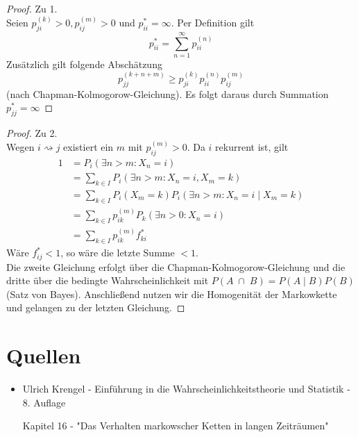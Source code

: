 \documentclass[a4paper]{article}
\begin{document}
\begin{proof}
	Zu 1.
	\\

	Seien $p_{ji} ^{(k)} > 0, p_{ij} ^{(m)} > 0$ und 
	$p_{ii} ^{*} = \infty$. Per Definition gilt
	\[
	p_{ii} ^{*} = \sum_{n=1}^{\infty} p_{ii} ^{(n)}
	\] 
	Zusätzlich gilt folgende Abschätzung 
	\[
	p_{jj} ^{(k+n+m)} \geq p_{ji} ^{(k)}
	p_{ii} ^{(n)} p_{ij} ^{(m)}
	\] 
	(nach Chapman-Kolmogorow-Gleichung).
	Es folgt daraus durch Summation $p_{jj} ^{*} = \infty$
\end{proof}

\begin{proof}
	Zu 2.
	\\
	
	Wegen $i \rightsquigarrow j$ existiert ein $m$ mit $p_{ij} ^{(m)} > 0$.
	Da $i$ rekurrent ist, gilt
	\begin{align*}
		1 &= P_i \left(
			\exists n > m : X_n = i
		\right) \\
		  &= \sum_{k \in I} P_i \left(
		  	\exists n > m: X_n = i, X_m = k
		  \right) \\
		  &= \sum_{k \in I}
		  P_i (X_m = k)
		  P_i \left(
		  	\exists n > m: X_n = i \; \vert \; X_m = k
		  \right) \\
		  &= \sum_{k \in I}
		  p_{ik} ^{(m)}
		  P_k \left(
		  	\exists n > 0: X_n = i
		  \right) \\
		  &= \sum_{k \in I}
		  p_{ik} ^{(m)}
		  f_{ki} ^{*}
	\end{align*}
	Wäre $f_{ij} ^{*} < 1$, so wäre die letzte Summe $<1$.
	\\

	Die zweite Gleichung erfolgt über die Chapman-Kolmogorow-Gleichung und die dritte über die
	bedingte Wahrscheinlichkeit mit $P(A \; \cap \; B) = P(A \; \vert \; B) P(B)$
	(Satz von Bayes). Anschließend nutzen wir die
	Homogenität der Markowkette und gelangen zu der letzten Gleichung.
\end{proof}

\section{Quellen}

\begin{itemize}
	\item Ulrich Krengel - Einführung in die Wahrscheinlichkeitstheorie und Statistik - 8. Auflage 

		Kapitel 16 - "Das Verhalten markowscher Ketten in langen Zeiträumen"
\end{itemize}
\end{document}
